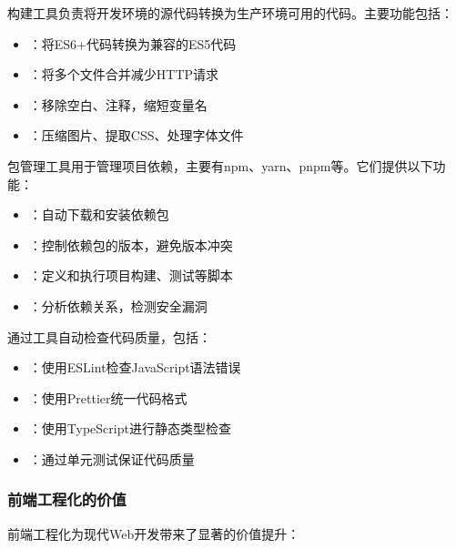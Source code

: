 
构建工具负责将开发环境的源代码转换为生产环境可用的代码。主要功能包括：

\begin{itemize}
\tightlist
\item
  ：将ES6+代码转换为兼容的ES5代码
\item
  ：将多个文件合并减少HTTP请求
\item
  ：移除空白、注释，缩短变量名
\item
  ：压缩图片、提取CSS、处理字体文件
\end{itemize}


包管理工具用于管理项目依赖，主要有npm、yarn、pnpm等。它们提供以下功能：

\begin{itemize}
\tightlist
\item
  ：自动下载和安装依赖包
\item
  ：控制依赖包的版本，避免版本冲突
\item
  ：定义和执行项目构建、测试等脚本
\item
  ：分析依赖关系，检测安全漏洞
\end{itemize}


通过工具自动检查代码质量，包括：

\begin{itemize}
\tightlist
\item
  ：使用ESLint检查JavaScript语法错误
\item
  ：使用Prettier统一代码格式
\item
  ：使用TypeScript进行静态类型检查
\item
  ：通过单元测试保证代码质量
\end{itemize}

\hypertarget{ux524dux7aefux5de5ux7a0bux5316ux7684ux4ef7ux503c}{%
\subsubsection{前端工程化的价值}\label{ux524dux7aefux5de5ux7a0bux5316ux7684ux4ef7ux503c}}

前端工程化为现代Web开发带来了显著的价值提升：

